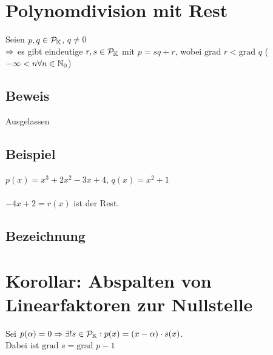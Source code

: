 \section{Polynomdivision mit Rest}\label{6.10}
Seien $p,q \in \mathcal{P}_{\mathbb{K}}$, $q \neq 0$\\
$\Rightarrow$ es gibt eindeutige $r,s \in \mathcal{P}_{\mathbb{K}}$ mit $p=sq+r$, wobei $\text{grad }r < \text{grad }q$ ($-\infty < n \forall n \in \mathbb{N}_0$)

\subsection*{Beweis}
Ausgelassen

\subsection*{Beispiel}
$p(x)=x^3+2x^2-3x+4$, $q(x)=x^2+1$\\
\\
$-4x+2=r(x)$ ist der Rest.

\subsection*{Bezeichnung}

\section{Korollar: Abspalten von Linearfaktoren zur Nullstelle}\label{6.11}
Sei $p(\alpha)=0 \Rightarrow \exists! s \in \mathcal{P}_{\mathbb{K}}: p(x)=(x-\alpha) \cdot s(x)$.\\
Dabei ist $\text{grad }s = \text{grad }p -1$